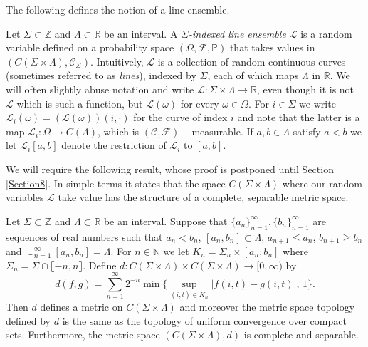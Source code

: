 The following defines the notion of a line ensemble.
\begin{definition}\label{CLEDef}
Let $\Sigma \subset \mathbb{Z}$ and $\Lambda \subset \mathbb{R}$ be an interval. A {\em $\Sigma$-indexed line ensemble $\mathcal{L}$} is a random variable defined on a probability space $(\Omega, \mathcal{F}, \mathbb{P})$ that takes values in $\left(C (\Sigma \times \Lambda), \mathcal{C}_{\Sigma}\right)$. Intuitively, $\mathcal{L}$ is a collection of random continuous curves (sometimes referred to as {\em lines}), indexed by $\Sigma$,  each of which maps $\Lambda$ in $\mathbb{R}$. We will often slightly abuse notation and write $\mathcal{L}: \Sigma \times \Lambda \rightarrow \mathbb{R}$, even though it is not $\mathcal{L}$ which is such a function, but $\mathcal{L}(\omega)$ for every $\omega \in \Omega$. For $i \in \Sigma$ we write $\mathcal{L}_i(\omega) = (\mathcal{L}(\omega))(i, \cdot)$ for the curve of index $i$ and note that the latter is a map $\mathcal{L}_i: \Omega \rightarrow C(\Lambda)$, which is $(\mathcal{C}, \mathcal{F})-$measurable. If $a,b \in \Lambda$ satisfy $a < b$ we let $\mathcal{L}_i[a,b]$ denote the restriction of $\mathcal{L}_i$ to $[a,b]$.
\end{definition}

We will require the following result, whose proof is postponed until Section \ref{Section8}. In simple terms it states that the space $C (\Sigma \times \Lambda)$ where our random variables $\mathcal{L}$ take value has the structure of a complete, separable metric space. 

\begin{lemma}\label{Polish} Let $\Sigma \subset \mathbb{Z}$ and $\Lambda \subset \mathbb{R}$ be an interval. Suppose that $\{a_n\}_{n = 1}^\infty, \{b_n\}_{n = 1}^\infty$ are sequences of real numbers such that $a_n < b_n$, $[a_n, b_n] \subset \Lambda$, $a_{n+1} \leq a_n$, $b_{n+1} \geq b_n$ and $\cup_{n = 1}^\infty [a_n, b_n] = \Lambda$. For $n \in \mathbb{N}$ we let $K_n = \Sigma_n \times [a_n, b_n]$ where $\Sigma_n = \Sigma \cap \llbracket -n, n \rrbracket$. Define $d: C (\Sigma \times \Lambda) \times C (\Sigma \times \Lambda) \rightarrow [0, \infty)$ by
\begin{equation} d (f,g) = \sum_{n=1}^\infty 2^{-n}\min\bigg\{\sup_{(i,t)\in K_n} |f(i,t) - g(i,t)|, \, 1\bigg\}.
\end{equation}
Then $d$ defines a metric on $C (\Sigma \times \Lambda) $ and moreover the metric space topology defined by $d$ is the same as the topology of uniform convergence over compact sets. Furthermore, the metric space $(C (\Sigma \times \Lambda), d)$ is complete and separable.
\end{lemma}

